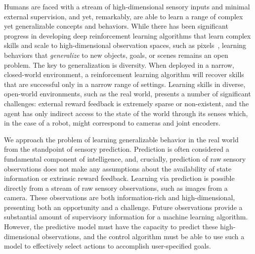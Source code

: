 

Humans are faced with a stream of high-dimensional sensory inputs and minimal external supervision, and yet, remarkably, are able to learn a range of complex yet generalizable concepts and behaviors.
While there has been significant progress in developing deep reinforcement learning algorithms that learn complex skills and scale to high-dimensional observation spaces, such as pixels~\cite{tdgammon,atari,e2e,alphago}, learning behaviors that \emph{generalize} to new objects, goals, or scenes remains an open problem.
The key to generalization is diversity. When deployed in a narrow, closed-world environment, a reinforcement learning algorithm will recover skills that are successful only in a narrow range of settings. 
Learning skills in diverse, open-world environments, such as the real world, presents a number of significant challenges: external reward feedback is extremely sparse or non-existent, and the agent has only indirect access to the state of the world through its senses which, in the case of a robot, might correspond to cameras and joint encoders.

We approach the problem of learning generalizable behavior in the real world from the standpoint of sensory prediction. Prediction is often considered a fundamental component of intelligence, and, crucially, prediction of raw sensory observations does not make any assumptions about the availability of state information or extrinsic reward feedback. Learning via prediction is possible directly from a stream of raw sensory observations, such as images from a camera. These observations are both information-rich and high-dimensional, presenting both an opportunity and a challenge. Future observations provide a substantial amount of supervisory information for a machine learning algorithm. However, the predictive model must have the capacity to predict these high-dimensional observations, and the control algorithm must be able to use such a model to effectively select actions to accomplish user-specified goals.


